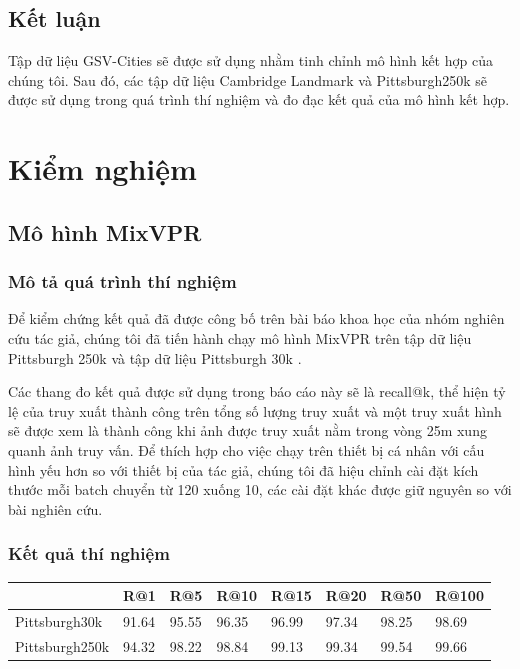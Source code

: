 \subsection{Kết luận}
Tập dữ liệu GSV-Cities \cite{Ali_bey_2022} sẽ được sử dụng nhằm tinh chỉnh mô hình kết hợp của chúng tôi. Sau đó, các tập dữ liệu Cambridge Landmark \cite{kendall2016posenet} và Pittsburgh250k \cite{6618963} sẽ được sử dụng trong quá trình thí nghiệm và đo đạc kết quả của mô hình kết hợp.

\section{Kiểm nghiệm}
\subsection{Mô hình MixVPR}
\subsubsection*{Mô tả quá trình thí nghiệm}

Để kiểm chứng kết quả đã được công bố trên bài báo khoa học của nhóm nghiên cứu tác giả, chúng tôi đã tiến hành chạy mô hình MixVPR \cite{alibey2023mixvpr} trên tập dữ liệu Pittsburgh 250k \cite{6618963} và tập dữ liệu Pittsburgh 30k \cite{6618963}.

Các thang đo kết quả được sử dụng trong báo cáo này sẽ là recall@k, thể hiện tỷ lệ của truy xuất thành công trên tổng số lượng truy xuất và một truy xuất hình sẽ được xem là thành công khi ảnh được truy xuất nằm trong vòng 25m xung quanh ảnh truy vấn. Để thích hợp cho việc chạy trên thiết bị cá nhân với cấu hình yếu hơn so với thiết bị của tác giả, chúng tôi đã hiệu chỉnh cài đặt kích thước mỗi batch chuyển từ 120 xuống 10, các cài đặt khác được giữ nguyên so với bài nghiên cứu.

\subsubsection*{Kết quả thí nghiệm}

\begin{table}[H]
	\centering
	\begin{tabular}{|l|l|l|l|l|l|l|l|}
	\hline
	               & \textbf{R@1} & \textbf{R@5} & \textbf{R@10} & \textbf{R@15} & \textbf{R@20} & \textbf{R@50} & \textbf{R@100} \\ \hline
	Pittsburgh30k  & 91.64        & 95.55        & 96.35         & 96.99         & 97.34         & 98.25         & 98.69          \\ \hline
	Pittsburgh250k & 94.32        & 98.22        & 98.84         & 99.13         & 99.34         & 99.54         & 99.66          \\ \hline
	\end{tabular}
\end{table}

